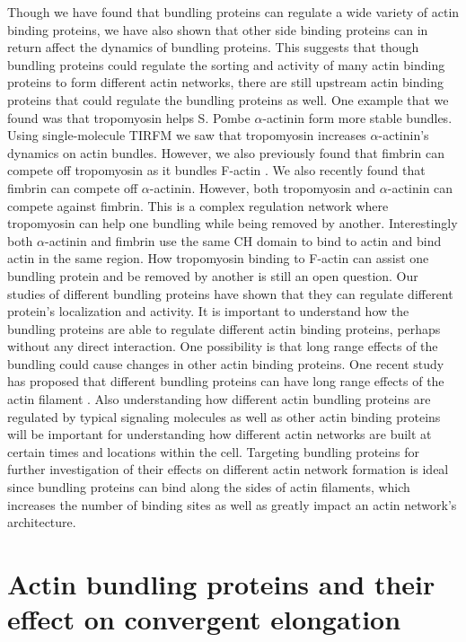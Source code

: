Though we have found that bundling proteins can regulate a wide variety of actin binding proteins, we have also shown that other side binding proteins can in return affect the dynamics of bundling proteins. This suggests that though bundling proteins could regulate the sorting and activity of many actin binding proteins to form different actin networks, there are still upstream actin binding proteins that could regulate the bundling proteins as well. One example that we found was that tropomyosin helps S. Pombe $\alpha$-actinin form more stable bundles. Using single-molecule TIRFM we saw that tropomyosin increases $\alpha$-actinin's dynamics on actin bundles. However, we also previously found that fimbrin can compete off tropomyosin as it bundles F-actin \citep{christensen_competition_2017}. We also recently found that fimbrin can compete off $\alpha$-actinin. However, both tropomyosin and $\alpha$-actinin can compete against fimbrin. This is a complex regulation network where tropomyosin can help one bundling while being removed by another. Interestingly both $\alpha$-actinin and fimbrin use the same CH domain to bind to actin and bind actin in the same region. How tropomyosin binding to F-actin can assist one bundling protein and be removed by another is still an open question. Our studies of different bundling proteins have shown that they can regulate different protein's localization and activity. It is important to understand how the bundling proteins are able to regulate different actin binding proteins, perhaps without any direct interaction. One possibility is that long range effects of the bundling could cause changes in other actin binding proteins. One recent study has proposed that different bundling proteins can have long range effects of the actin filament \citep{turmer_fascin_2015}. Also understanding how different actin bundling proteins are regulated by typical signaling molecules as well as other actin binding proteins will be important for understanding how different actin networks are built at certain times and locations within the cell. Targeting bundling proteins for further investigation of their effects on different actin network formation is ideal since bundling proteins can bind along the sides of actin filaments, which increases the number of binding sites as well as greatly impact an actin network's architecture.  

\section{Actin bundling proteins and their effect on convergent elongation}\label{bundler-conclusions}

